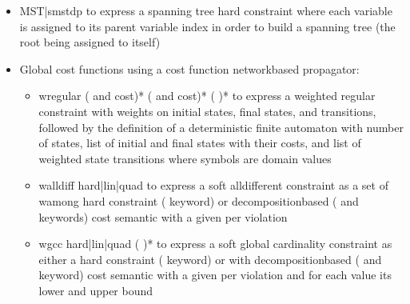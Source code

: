 \documentclass[letterpaper,10pt,openany,oneside,english]{sphinxmanual}
\begin{document}
\begin{fulllineitems}
\begin{itemize}
\begin{itemize}
\item {} 
\sphinxAtStartPar
MST|smstdp to express a spanning tree hard constraint where each variable is assigned to its parent variable index in order to build a spanning tree (the root being assigned to itself)

\end{itemize}


\end{itemize}


\sphinxAtStartPar
\begin{itemize}
\item {} 
\sphinxAtStartPar
Global cost functions using a cost function network\sphinxhyphen{}based propagator:\begin{itemize}
\item {} 
\sphinxAtStartPar
wregular   ( and cost)*  ( and cost)*  (   )* to express a weighted regular constraint with weights on initial states, final states, and transitions, followed by the definition of a deterministic finite automaton with number of states, list of initial and final states with their costs, and list of weighted state transitions where symbols are domain values

\item {} 
\sphinxAtStartPar
walldiff hard|lin|quad  to express a soft alldifferent constraint as a set of wamong hard constraint ( keyword) or decomposition\sphinxhyphen{}based ( and  keywords) cost semantic with a given  per violation

\item {} 
\sphinxAtStartPar
wgcc hard|lin|quad   (  )* to express a soft global cardinality constraint as either a hard constraint ( keyword) or with decomposition\sphinxhyphen{}based ( and  keyword) cost semantic with a given  per violation and for each value its lower and upper bound


\end{itemize}
\end{itemize}
\end{fulllineitems}
\end{document}
